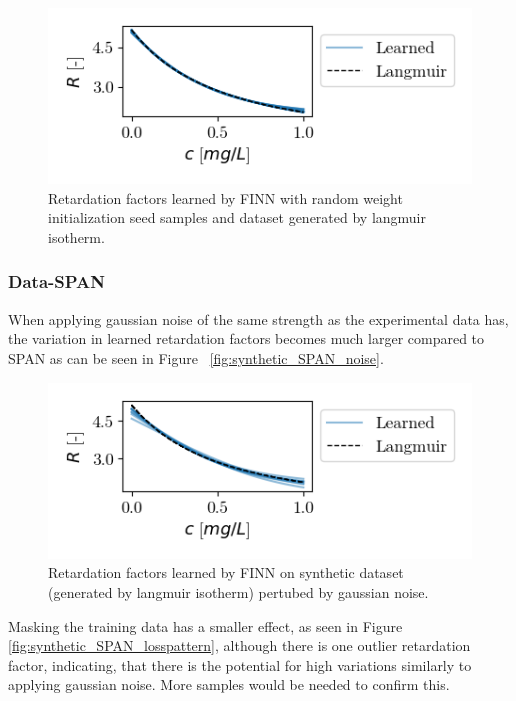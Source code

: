 \begin{figure}[h]
    \centering
    \includegraphics{figs/finn_synthetic_SPAN_seed.png}
    \caption{Retardation factors learned by FINN with random weight initialization seed samples and dataset generated by langmuir isotherm.}
    \label{fig:synthetic_SPAN_seed}
\end{figure}



\subsubsection{Data-SPAN}
When applying gaussian noise of the same strength as the experimental data has, the variation in learned retardation factors becomes much larger compared to SPAN as can be seen in Figure ~\vref{fig:synthetic_SPAN_noise}.

\begin{figure}[h]
    \centering
    \includegraphics{figs/finn_synthetic_SPAN_noise.png}
    \caption{Retardation factors learned by FINN on synthetic dataset (generated by langmuir isotherm) pertubed by gaussian noise.}
    \label{fig:synthetic_SPAN_noise}
\end{figure}


Masking the training data has a smaller effect, as seen in Figure \vref{fig:synthetic_SPAN_losspattern}, although there is one outlier retardation factor, indicating, that there is the potential for high variations similarly to applying gaussian noise. More samples would be needed to confirm this.

